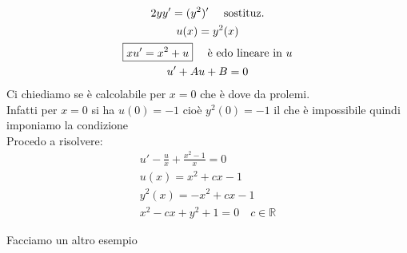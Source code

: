 \documentclass[a4paper, oneside]{article}
\begin{document}
\begin{example}
    \begin{gather*}
        2yy' = (y^2)' \quad \text{ sostituz.}\\
        u(x) = y^2(x)\\
        \boxed{xu' = \-x^2 + u} \quad \text{ è edo lineare in $u$}\\
        u' + Au + B = 0
    \end{gather*}
    Ci chiediamo se è calcolabile per $x=0$ che è dove da prolemi.\\
    Infatti per $x=0$ si ha $u(0) = -1$ cioè $y^2(0) = -1$ il che è impossibile quindi imponiamo la condizione \\
    Procedo a risolvere:
    \begin{gather*}
        u' - \frac{u}{x} + \frac{x^2-1}{x} = 0\\
        u(x) = x^2 + cx -1\\
        y^2(x) = -x^2 +cx -1\\
        x^2 -cx +y^2 +1 = 0 \quad c \in \mathbb{R}
    \end{gather*}
\end{example}
Facciamo un altro esempio 
\end{document}
